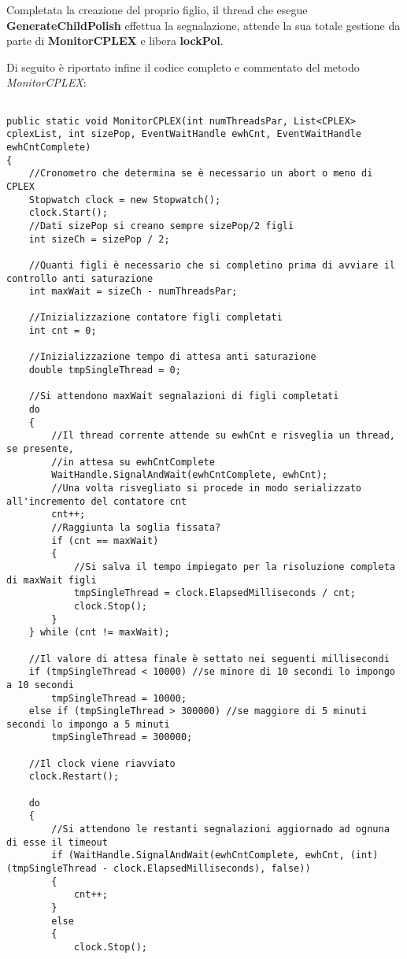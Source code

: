 \documentclass[11pt]{article}
\begin{document}
Completata la creazione del proprio figlio, il thread che esegue \textbf{GenerateChildPolish} effettua la segnalazione, attende la sua totale gestione da parte di \textbf{MonitorCPLEX} e libera \textbf{lockPol}.

Di seguito è riportato infine il codice completo e commentato del metodo \textit{MonitorCPLEX}:

\begin{lstlisting}

public static void MonitorCPLEX(int numThreadsPar, List<CPLEX> cplexList, int sizePop, EventWaitHandle ewhCnt, EventWaitHandle ewhCntComplete)
{
    //Cronometro che determina se è necessario un abort o meno di CPLEX
    Stopwatch clock = new Stopwatch();
    clock.Start();
    //Dati sizePop si creano sempre sizePop/2 figli
    int sizeCh = sizePop / 2;

    //Quanti figli è necessario che si completino prima di avviare il controllo anti saturazione
    int maxWait = sizeCh - numThreadsPar;

    //Inizializzazione contatore figli completati
    int cnt = 0;
    
    //Inizializzazione tempo di attesa anti saturazione
    double tmpSingleThread = 0;

    //Si attendono maxWait segnalazioni di figli completati
    do
    {
        //Il thread corrente attende su ewhCnt e risveglia un thread, se presente,
        //in attesa su ewhCntComplete
        WaitHandle.SignalAndWait(ewhCntComplete, ewhCnt);
        //Una volta risvegliato si procede in modo serializzato all'incremento del contatore cnt
        cnt++;
        //Raggiunta la soglia fissata?
        if (cnt == maxWait)
        {
            //Si salva il tempo impiegato per la risoluzione completa di maxWait figli
            tmpSingleThread = clock.ElapsedMilliseconds / cnt;
            clock.Stop();
        }
    } while (cnt != maxWait);

    //Il valore di attesa finale è settato nei seguenti millisecondi
    if (tmpSingleThread < 10000) //se minore di 10 secondi lo impongo a 10 secondi
        tmpSingleThread = 10000;
    else if (tmpSingleThread > 300000) //se maggiore di 5 minuti secondi lo impongo a 5 minuti
        tmpSingleThread = 300000;

    //Il clock viene riavviato
    clock.Restart();

    do
    {
        //Si attendono le restanti segnalazioni aggiornado ad ognuna di esse il timeout
        if (WaitHandle.SignalAndWait(ewhCntComplete, ewhCnt, (int)(tmpSingleThread - clock.ElapsedMilliseconds), false))
        {
            cnt++;
        }
        else
        {
            clock.Stop();


\end{lstlisting}
\end{document}
